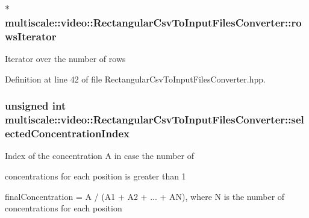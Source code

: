 \hypertarget{classmultiscale_1_1video_1_1RectangularCsvToInputFilesConverter_a19fa13140bc5d6b163222030b6dfe61e}{
\subsubsection[{rows\-Iterator}]{$\ast$ multiscale\-::video\-::\-Rectangular\-Csv\-To\-Input\-Files\-Converter\-::rows\-Iterator\hspace{0.3cm}{\ttfamily [private]}}}\label{classmultiscale_1_1video_1_1RectangularCsvToInputFilesConverter_a19fa13140bc5d6b163222030b6dfe61e}
Iterator over the number of rows 

Definition at line 42 of file Rectangular\-Csv\-To\-Input\-Files\-Converter.\-hpp.

\hypertarget{classmultiscale_1_1video_1_1RectangularCsvToInputFilesConverter_a5143d25a98a097107c2bed748b4d8df0}{
\subsubsection[{selected\-Concentration\-Index}]{\setlength{\rightskip}{0pt plus 5cm}unsigned int multiscale\-::video\-::\-Rectangular\-Csv\-To\-Input\-Files\-Converter\-::selected\-Concentration\-Index\hspace{0.3cm}{\ttfamily [private]}}}\label{classmultiscale_1_1video_1_1RectangularCsvToInputFilesConverter_a5143d25a98a097107c2bed748b4d8df0}
\begin{DoxyVerb}    Index of the concentration A in case the number of
\end{DoxyVerb}
 concentrations for each position is greater than 1

final\-Concentration = A / (A1 + A2 + ... + A\-N), where N is the number of concentrations for each position 

